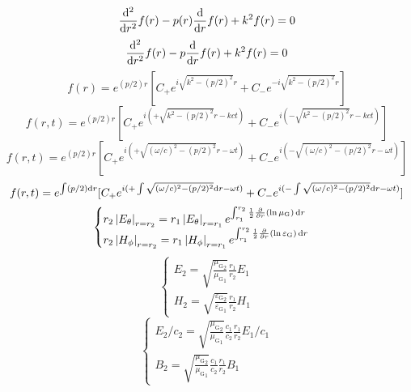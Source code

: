 \begin{equation}
    \frac{\mathrm{d}^2}{\mathrm{d} r^2}f(r)-p(r)\frac{\mathrm{d}}{\mathrm{d} r}f(r)+k^2f(r)=0
\end{equation}
\begin{equation}
    \frac{\mathrm{d}^2}{\mathrm{d} r^2}f(r)-p\frac{\mathrm{d}}{\mathrm{d} r}f(r)+k^2f(r)=0
\end{equation}
\begin{equation}
    f(r)=e^{(p/2)r}[C_+e^{i\sqrt{k^2-(p/2)^2}r}+C_-e^{-i\sqrt{k^2-(p/2)^2}r}]
\end{equation}
\begin{equation}
    f(r,t)=e^{(p/2)r}[C_+e^{i(+\sqrt{k^2-(p/2)^2}r-kct)}+C_-e^{i(-\sqrt{k^2-(p/2)^2}r-kct)}]
\end{equation}
\begin{equation}
    f(r,t)=e^{(p/2)r}[C_+e^{i(+\sqrt{(\omega/c)^2-(p/2)^2}r-\omega t)}+C_-e^{i(-\sqrt{(\omega/c)^2-(p/2)^2}r-\omega t)}]
\end{equation}
\begin{equation}
    f(r,t)=e^{\int(p/2)\mathrm{d} r}[C_+e^{i(+\int\sqrt{(\omega/c)^2-(p/2)^2}\mathrm{d} r-\omega t)}+C_-e^{i(-\int\sqrt{(\omega/c)^2-(p/2)^2}\mathrm{d} r-\omega t)}]
\end{equation}
\begin{equation}
    \begin{cases}
        r_2\left\lvert {E}_\theta\right\rvert_{r=r_2}=r_1\left\lvert {E}_\theta\right\rvert_{r=r_1}e^{\int_{r_1}^{r_2}\frac{1}{2}\frac{\partial}{\partial r}(\ln\mu_{\text{G}})\,\mathrm{d} r}\\
        r_2\left\lvert {H}_\phi\right\rvert_{r=r_2}=r_1\left\lvert {H}_\phi\right\rvert_{r=r_1}e^{\int_{r_1}^{r_2}\frac{1}{2}\frac{\partial}{\partial r}(\ln\varepsilon_{\text{G}})\,\mathrm{d} r}
    \end{cases}
\end{equation}
\begin{equation}
    \begin{cases}
        {E}_2=\sqrt{\frac{{\mu_{\text{G}}}_2}{{\mu_{\text{G}}}_1}}\frac{r_1}{r_2}{E}_1\\
        {H}_2=\sqrt{\frac{{\varepsilon_{\text{G}}}_2}{{\varepsilon_{\text{G}}}_1}}\frac{r_1}{r_2}{H}_1
    \end{cases}
\end{equation}
\begin{equation}
    \begin{cases}
        {E}_2/c_2=\sqrt{\frac{{\mu_{\text{G}}}_2}{{\mu_{\text{G}}}_1}}\frac{c_1}{c_2}\frac{r_1}{r_2}{E}_1/c_1\\
        {B}_2=\sqrt{\frac{{\mu_{\text{G}}}_2}{{\mu_{\text{G}}}_1}}\frac{c_1}{c_2}\frac{r_1}{r_2}{B}_1
    \end{cases}
\end{equation}
